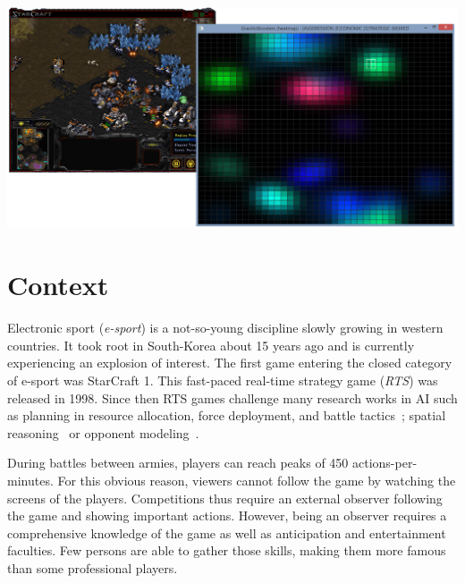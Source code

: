 \documentclass{jfsma}
\begin{document}
	\maketitle

	\begin{strip}
  \centering\noindent
  \includegraphics[scale=0.30]{gfx/GB}
  \vspace{0.3cm}
\end{strip}

	\section{Context}
    Electronic sport (\textit{e-sport}) is a not-so-young discipline slowly growing in western countries.
    It took root in South-Korea about 15 years ago and is currently experiencing an explosion of interest.
    The first game entering the closed category of e-sport was StarCraft 1. %
    This fast-paced real-time strategy game (\textit{RTS}) was released in 1998.
    Since then RTS games challenge many research works in AI such as planning in resource allocation, force deployment, and battle tactics~\cite{weber2009case,mccoy2008integrated}; spatial reasoning~\cite{forbus2002qualitative} or opponent modeling~\cite{schadd2007opponent}.

    During battles between armies, players can reach peaks of 450 actions-per-minutes.
    For this obvious reason, viewers cannot follow the game by watching the screens of the players.
    Competitions thus require an external observer following the game and showing important actions.
    However, being an observer requires a comprehensive knowledge of the game as well as anticipation and entertainment faculties.
    Few persons are able to gather those skills, making them more famous than some professional players.
\end{document}
